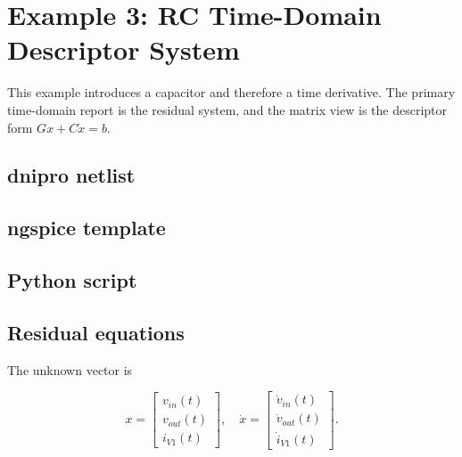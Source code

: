 \documentclass[11pt,a4paper]{article}
\begin{document}
\section{Example 3: RC Time-Domain Descriptor System}
\label{sec:ex-rc-time-descriptor}

This example introduces a capacitor and therefore a time derivative. The primary
time-domain report is the residual system, and the matrix view is the descriptor
form \(Gx + C\dot{x}=b\).

\subsection{dnipro netlist}



\subsection{ngspice template}



\subsection{Python script}



\subsection{Residual equations}

The unknown vector is

\begin{equation}
    x =
    \begin{bmatrix}
        v_{in}(t) \\
        v_{out}(t) \\
        i_{V1}(t)
    \end{bmatrix},
    \quad
    \dot{x} =
    \begin{bmatrix}
        \dot{v}_{in}(t) \\
        \dot{v}_{out}(t) \\
        \dot{i}_{V1}(t)
    \end{bmatrix}.
\end{equation}
\end{document}
